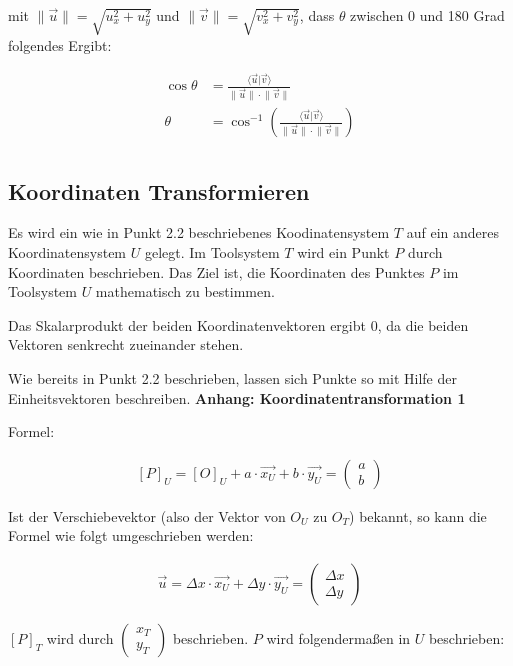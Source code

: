 \documentclass{article}
\newcommand{\m}[1]{\begin{pmatrix}#1\end{pmatrix}}
\begin{document}
    mit $\lVert \vec{u} \rVert = \sqrt{u_x^2 + u_y^2}$ und $\lVert \vec{v} \rVert = \sqrt{v_x^2 + v_y^2}$, dass $\theta$ zwischen 0 und 180 Grad folgendes Ergibt:
     
    \[
      \begin{split}
        \cos \theta &= \frac{\langle \vec{u} \vert \vec{v} \rangle}{\lVert \vec{u} \rVert \cdot \lVert \vec{v} \rVert} \\
        \theta &= \cos^{-1} \left ( \frac{\langle \vec{u} \vert \vec{v} \rangle}{\lVert \vec{u} \rVert \cdot \lVert \vec{v} \rVert} \right ) \\
      \end{split}  
    \]

    \subsection{Koordinaten Transformieren}

    Es wird ein wie in Punkt 2.2 beschriebenes Koodinatensystem $T$ auf ein anderes Koordinatensystem $U$ gelegt.
    Im Toolsystem $T$ wird ein Punkt $P$ durch Koordinaten beschrieben.
    Das Ziel ist, die Koordinaten des Punktes $P$ im Toolsystem $U$ mathematisch zu bestimmen.

    Das Skalarprodukt der beiden Koordinatenvektoren ergibt $0$, da die beiden Vektoren senkrecht zueinander stehen.

    Wie bereits in Punkt 2.2 beschrieben, lassen sich Punkte so mit Hilfe der Einheitsvektoren
    beschreiben. \textbf{Anhang: Koordinatentransformation 1}

    Formel:

    \[
        \begin{split}
            {[P]}_{U} = {[O]}_{U} + a \cdot \vec{{x}_{U}} + b \cdot \vec{{y}_{U}} = \m{a \\ b}
        \end{split}
    \]

    Ist der Verschiebevektor (also der Vektor von $O_U$ zu $O_T$) bekannt,
    so kann die Formel wie folgt umgeschrieben werden:

    \[
        \begin{split}
            \vec{u} = \Delta x \cdot \vec{{x}_{U}} + \Delta y \cdot \vec{{y}_{U}} = \m{\Delta x \\ \Delta y}
        \end{split}
    \]

    ${[P]}_{T}$ wird durch $\m{x_T \\ y_T}$ beschrieben. $P$ wird folgendermaßen in $U$ beschrieben:
\end{document}
